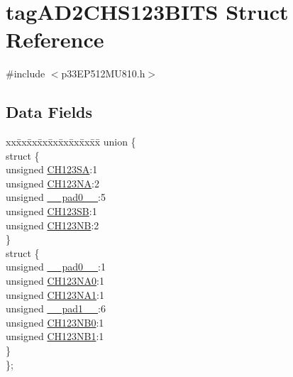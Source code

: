 \hypertarget{structtag_a_d2_c_h_s123_b_i_t_s}{}\section{tag\+A\+D2\+C\+H\+S123\+B\+I\+TS Struct Reference}
\label{structtag_a_d2_c_h_s123_b_i_t_s}


{\ttfamily \#include $<$p33\+E\+P512\+M\+U810.\+h$>$}

\subsection*{Data Fields}
\begin{DoxyCompactItemize}
\item 
\begin{tabbing}
xx\=xx\=xx\=xx\=xx\=xx\=xx\=xx\=xx\=\kill
union \{\\
\>struct \{\\
\>\>unsigned \hyperlink{structtag_a_d2_c_h_s123_b_i_t_s_aa5c792555a378a509a857e720d13fc00}{CH123SA}:1\\
\>\>unsigned \hyperlink{structtag_a_d2_c_h_s123_b_i_t_s_ab77f3f8df06242b31213cffdcdfd203b}{CH123NA}:2\\
\>\>unsigned \hyperlink{structtag_a_d2_c_h_s123_b_i_t_s_adf71f3d8410c1f1dbbc96680a92c49af}{\_\_pad0\_\_}:5\\
\>\>unsigned \hyperlink{structtag_a_d2_c_h_s123_b_i_t_s_a43fe4bf282da0b96630808288b9dfdd6}{CH123SB}:1\\
\>\>unsigned \hyperlink{structtag_a_d2_c_h_s123_b_i_t_s_aeaba540c7c535813510f4eb5ab86c92f}{CH123NB}:2\\
\>\} \\
\>struct \{\\
\>\>unsigned \hyperlink{structtag_a_d2_c_h_s123_b_i_t_s_adf71f3d8410c1f1dbbc96680a92c49af}{\_\_pad0\_\_}:1\\
\>\>unsigned \hyperlink{structtag_a_d2_c_h_s123_b_i_t_s_a1e3341ed38e13e66c36c360cfbf6845d}{CH123NA0}:1\\
\>\>unsigned \hyperlink{structtag_a_d2_c_h_s123_b_i_t_s_aaf160b5bc9911cc6291337cab1339e14}{CH123NA1}:1\\
\>\>unsigned \hyperlink{structtag_a_d2_c_h_s123_b_i_t_s_acaf2d0924a107ec6e8d2e31febaf66f9}{\_\_pad1\_\_}:6\\
\>\>unsigned \hyperlink{structtag_a_d2_c_h_s123_b_i_t_s_a5f8a569877f7f7bdfb2727a46fe99c69}{CH123NB0}:1\\
\>\>unsigned \hyperlink{structtag_a_d2_c_h_s123_b_i_t_s_a8eedf6488c82f199ac9e768c5f4d5f3e}{CH123NB1}:1\\
\>\} \\
\}; \\

\end{tabbing}\end{DoxyCompactItemize}


